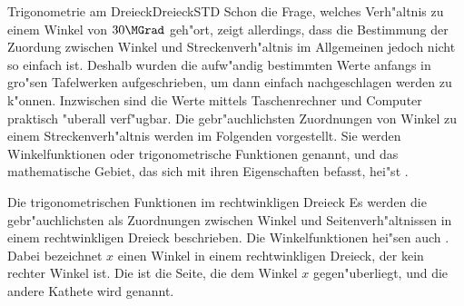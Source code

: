 \begin{MXContent}{Trigonometrie am Dreieck}{Dreieck}{STD}
Schon die Frage, welches Verh"altnis zu einem Winkel von $30\MGrad$ geh"ort,
zeigt allerdings, dass die Bestimmung der Zuordung zwischen Winkel und 
Streckenverh"altnis im Allgemeinen jedoch nicht so einfach ist.
Deshalb wurden die aufw"andig bestimmten Werte anfangs in gro"sen Tafelwerken 
aufgeschrieben, um dann einfach nachgeschlagen werden zu k"onnen.
Inzwischen sind die Werte mittels Taschenrechner und Computer praktisch 
"uberall verf"ugbar. Die gebr"auchlichsten Zuordnungen von Winkel zu einem 
Streckenverh"altnis werden im Folgenden vorgestellt. 
Sie werden Winkelfunktionen oder trigonometrische Funktionen genannt, und 
das mathematische Gebiet, das sich mit ihren Eigenschaften befasst, hei"st
.

\begin{MXInfo}{Die trigonometrischen Funktionen im rechtwinkligen Dreieck}%
Es werden die gebr"auchlichsten 
als Zuordnungen zwischen Winkel und Seitenverh"altnissen in einem rechtwinkligen 
Dreieck beschrieben. Die Winkelfunktionen hei"sen auch 
.
Dabei bezeichnet $x$ einen Winkel in einem rechtwinkligen Dreieck, der 
kein rechter Winkel ist.
Die  ist die Seite, die dem Winkel $x$ 
gegen"uberliegt, und die andere Kathete wird  
genannt.

\begin{center}
\end{center}


\end{MXInfo}
\end{MXContent}
